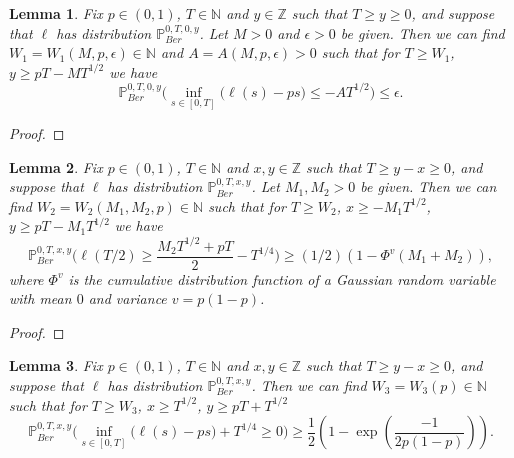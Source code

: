 \documentclass[12pt]{article}
\newtheorem{lemma}{Lemma}
\begin{document}
	\begin{lemma}\label{LemmaMinFreeS4} Fix $p \in (0,1)$, $T \in \mathbb{N}$ and $y\in \mathbb{Z}$ such that $T \geq y \geq 0$, and suppose that $\ell$ has distribution $\mathbb{P}^{0,T,0,y}_{Ber}$. Let $M > 0$ and $\epsilon > 0$ be given. Then we can find $W_1=W_1(M,p, \epsilon) \in \mathbb{N}$ and $A=A(M,p, \epsilon) > 0$ such that for $T \geq W_1$, $ y \geq p T -  MT^{1/2}$ we have
		\begin{equation}\label{minFree1S4}
		\mathbb{P}^{0,T,0,y}_{Ber}\Big( \inf_{s \in [ 0, T]}\big( \ell(s) -  ps \big) \leq -AT^{1/2} \Big) \leq \epsilon.
		\end{equation}
	\end{lemma}
	
	\begin{proof}
		
	\end{proof}

	\begin{lemma}\label{LemmaTailS4}Fix $p \in (0,1)$, $T \in \mathbb{N}$ and $x, y\in \mathbb{Z}$ such that $T \geq y-x \geq 0$, and suppose that $\ell$ has distribution $\mathbb{P}^{0,T,x,y}_{Ber}$. Let $M_1,M_2 > 0$ be given. Then we can find $W_2 = W_2(M_1,M_2,p) \in \mathbb{N}$ such that for $T \geq W_2$, $ x \geq -M_1T^{1/2}$, $ y \geq pT -  M_1T^{1/2}$ we have
		\begin{equation}\label{halfEq2S4}
		\mathbb{P}^{0,T,x,y}_{Ber}\bigg( \ell( T/2 )  \geq \frac{M_2T^{1/2} + p T}{2} - T^{1/4} \bigg) \geq (1/2) (1 - \Phi^{v}(M_1 + M_2) ),
		\end{equation}
		where $\Phi^{v}$ is the cumulative distribution function  of a Gaussian random variable with mean $0$ and variance $v = p(1-p)$.
	\end{lemma}
	
	\begin{proof}
		
	\end{proof}

	\begin{lemma}\label{LemmaAwayS4} Fix $p \in (0,1)$, $T \in \mathbb{N}$ and $x, y\in \mathbb{Z}$ such that $T \geq y-x \geq 0$, and suppose that $\ell$ has distribution $\mathbb{P}^{0,T,x,y}_{Ber}$. Then we can find $W_3 = W_3(p) \in \mathbb{N}$ such that for $T \geq W_3$, $ x \geq T^{1/2}$, $ y \geq pT +  T^{1/2}$
		\begin{equation}\label{awayS4}
		\mathbb{P}^{0,T,x,y}_{Ber}\Big( \inf_{s \in [0,T]} \big( \ell(s) -ps \big)+ T^{1/4} \geq 0 \Big) \geq \frac{1}{2} \left(1 - \exp\left(\frac{-1}{2p(1-p)}\right)\right).
		\end{equation}
	\end{lemma}
	
\end{document}
